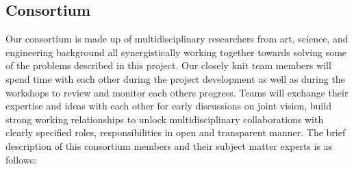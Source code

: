 \subsection{Consortium}
Our consortium is made up of multidisciplinary researchers from art, science, and engineering background all synergistically working together towards solving some of the problems described in this project. Our closely knit team members will spend time with each other during the project development as well as during the workshops to review and monitor each others progress. Teams will exchange their expertise and ideas with each other for early discussions on joint vision, build strong working relationships to unlock multidisciplinary collaborations with clearly specified roles, responsibilities in open and transparent manner. The brief description of this consortium members and their subject matter experts is as follows:

\begin{enumerate}[nosep,left=0mm,wide=0mm,font=\bfseries]
    
\end{enumerate}

